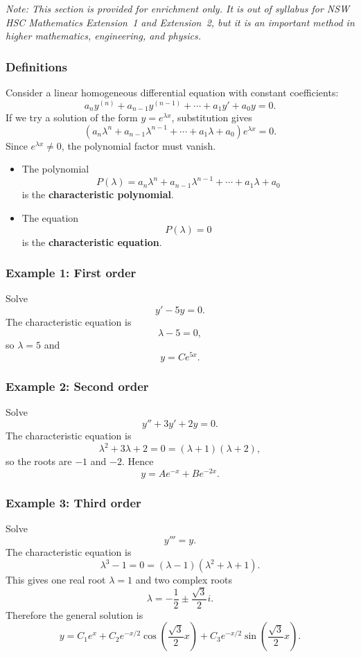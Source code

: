 \textit{Note: This section is provided for enrichment only. It is out of syllabus for NSW HSC Mathematics Extension~1 and Extension~2, but it is an important method in higher mathematics, engineering, and physics.}

\subsubsection*{Definitions}
Consider a linear homogeneous differential equation with constant coefficients:
\[
a_n y^{(n)}+a_{n-1}y^{(n-1)}+\cdots+a_1y'+a_0y=0.
\]
If we try a solution of the form $y=e^{\lambda x}$, substitution gives
\[
\left(a_n\lambda^n+a_{n-1}\lambda^{n-1}+\cdots+a_1\lambda+a_0\right)e^{\lambda x}=0.
\]
Since $e^{\lambda x}\neq 0$, the polynomial factor must vanish.

\begin{itemize}[leftmargin=*]
  \item The polynomial
  \[
  P(\lambda)=a_n\lambda^n+a_{n-1}\lambda^{n-1}+\cdots+a_1\lambda+a_0
  \]
  is the \textbf{characteristic polynomial}.
  \item The equation
  \[
  P(\lambda)=0
  \]
  is the \textbf{characteristic equation}.
\end{itemize}

\subsubsection*{Example 1: First order}
Solve
\[
y'-5y=0.
\]
The characteristic equation is
\[
\lambda-5=0,
\]
so $\lambda=5$ and
\[
y=Ce^{5x}.
\]

\subsubsection*{Example 2: Second order}
Solve
\[
y''+3y'+2y=0.
\]
The characteristic equation is
\[
\lambda^2+3\lambda+2=0=(\lambda+1)(\lambda+2),
\]
so the roots are $-1$ and $-2$. Hence
\[
y=Ae^{-x}+Be^{-2x}.
\]

\subsubsection*{Example 3: Third order}
Solve
\[
y'''=y.
\]
The characteristic equation is
\[
\lambda^3-1=0=(\lambda-1)(\lambda^2+\lambda+1).
\]
This gives one real root $\lambda=1$ and two complex roots
\[
\lambda=-\frac12\pm \frac{\sqrt{3}}{2}i.
\]
Therefore the general solution is
\[
y=C_1e^x+C_2e^{-x/2}\cos\left(\frac{\sqrt{3}}{2}x\right)+C_3e^{-x/2}\sin\left(\frac{\sqrt{3}}{2}x\right).
\]


